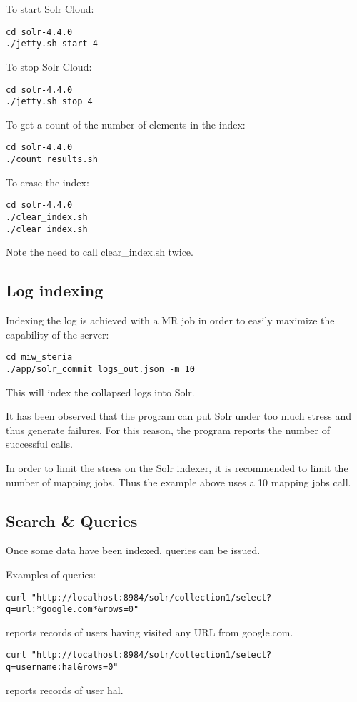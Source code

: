 \documentclass[twoside,11pt]{article}
\begin{document}
To start Solr Cloud:
\begin{verbatim}
cd solr-4.4.0 
./jetty.sh start 4
\end{verbatim}

To stop Solr Cloud:
\begin{verbatim}
cd solr-4.4.0 
./jetty.sh stop 4
\end{verbatim}

To get a count of the number of elements in the index:
\begin{verbatim}
cd solr-4.4.0
./count_results.sh
\end{verbatim}

To erase the index:
\begin{verbatim}
cd solr-4.4.0
./clear_index.sh
./clear_index.sh
\end{verbatim}
Note the need to call clear\_index.sh twice.

\subsection{Log indexing}
Indexing the log is achieved with a MR job in order to easily maximize the capability of the server:
\begin{verbatim}
cd miw_steria
./app/solr_commit logs_out.json -m 10
\end{verbatim}
This will index the collapsed logs into Solr. 

It has been observed that the program can put Solr under too much stress and thus generate failures. For this reason, the program reports the number of successful calls.

In order to limit the stress on the Solr indexer, it is recommended to limit the number of mapping jobs. Thus the example above uses a 10 mapping jobs call.

\subsection{Search \& Queries}
Once some data have been indexed, queries can be issued.

Examples of queries:
\begin{verbatim}
curl "http://localhost:8984/solr/collection1/select?q=url:*google.com*&rows=0"
\end{verbatim}
reports records of users having visited any URL from google.com.

\begin{verbatim}
curl "http://localhost:8984/solr/collection1/select?q=username:hal&rows=0"
\end{verbatim}
reports records of user hal.
\end{document}
